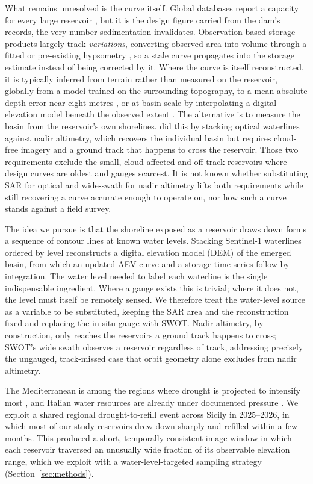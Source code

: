 What remains unresolved is the curve itself. Global databases report a capacity for every
large reservoir \citep{Lehner2011}, but it is the design figure carried from the dam's
records, the very number sedimentation invalidates. Observation-based storage products
largely track \emph{variations}, converting observed area into volume through a fitted or
pre-existing hypsometry \citep{BuskerEtAl2019}, so a stale curve propagates into the storage
estimate instead of being corrected by it. Where the curve is itself reconstructed, it is
typically inferred from terrain rather than measured on the reservoir, globally from a model
trained on the surrounding topography, to a mean absolute depth error near eight metres
\citep{Hao2024}, or at basin scale by interpolating a digital elevation model beneath the
observed extent \citep{BhatpuriaEtAl2024}. The alternative
is to measure the basin from the reservoir's own shorelines. \citet{Schwatke2020} did this by
stacking optical waterlines against nadir altimetry, which recovers the individual basin but
requires cloud-free imagery and a ground track that happens to cross the reservoir. Those two
requirements exclude the small, cloud-affected and off-track reservoirs where design curves
are oldest and gauges scarcest. It is not known whether substituting SAR for optical and
wide-swath for nadir altimetry lifts both requirements while still recovering a curve
accurate enough to operate on, nor how such a curve stands against a field survey.

The idea we pursue is that the shoreline exposed as a reservoir draws down forms a
sequence of contour lines at known water levels. Stacking Sentinel-1 waterlines ordered
by level reconstructs a digital elevation model (DEM) of the emerged basin, from which an
updated AEV curve and a storage time series follow by integration. The water level needed
to label each waterline is the single indispensable ingredient. Where a gauge exists this
is trivial; where it does not, the level must itself be remotely sensed. We therefore
treat the water-level source as a variable to be substituted, keeping the SAR area and
the reconstruction fixed and replacing the in-situ gauge with SWOT. Nadir altimetry, by
construction, only reaches the reservoirs a ground
track happens to cross; SWOT's wide swath observes a reservoir regardless of track,
addressing precisely the ungauged, track-missed case that orbit geometry alone excludes
from nadir altimetry.

The Mediterranean is among the regions where drought is projected to intensify most
\citep{IPCC2023, Cammalleri2022, Bevacqua2023}, and Italian water resources are already
under documented pressure \citep{ISPRA2023}. We exploit a shared regional
drought-to-refill event across Sicily in 2025--2026, in which most of our study
reservoirs drew down sharply and refilled within a few months. This produced a
short, temporally consistent image window in which each reservoir traversed an
unusually wide fraction of its observable elevation range, which we exploit with a
water-level-targeted sampling strategy (Section~\ref{sec:methods}).

